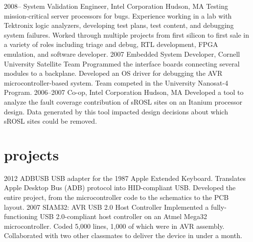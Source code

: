 \documentclass[]{friggeri-cv}
\begin{document}
\begin{entrylist}
  \entry
    {2008--}
    {System Validation Engineer, Intel Corporation}
    {Hudson, MA}
    {Testing mission-critical server processors for bugs. Experience working in a lab with Tektronix logic analyzers, developing test plans, test content, and debugging system failures. Worked through multiple projects from first silicon to first sale in a variety of roles including triage and debug, RTL development, FPGA emulation, and software developer.}
  \entry
    {2007}
    {Embedded System Developer, Cornell University Satellite Team}
    {}
    {Programmed the interface boards connecting several modules to a backplane. Developed an OS driver for debugging the AVR microcontroller-based system. Team competed in the University Nanosat-4 Program.}
  \entry
    {2006--2007}
    {Co-op, Intel Corporation}
    {Hudson, MA}
    {Developed a tool to analyze the fault coverage contribution of sROSL sites on an Itanium processor design. Data generated by this tool impacted design decisions about which sROSL sites could be removed.}
\end{entrylist}

\section{projects}

\begin{entrylist}
  \entry
    {2012}
    {ADBUSB}
    {}
    {USB adapter for the 1987 Apple Extended Keyboard. Translates Apple Desktop Bus (ADB) protocol into HID-compliant USB. Developed the entire project, from the microcontroller code to the schematics to the PCB layout.}
  \entry
    {2007}
    {SIAM32: AVR USB 2.0 Host Controller}
    {}
    {Implemented a fully-functioning USB 2.0-compliant host controller on an Atmel Mega32 microcontroller. Coded 5,000 lines, 1,000 of which were in AVR assembly. Collaborated with two other classmates to deliver the device in under a month.}
\end{entrylist}
\end{document}
